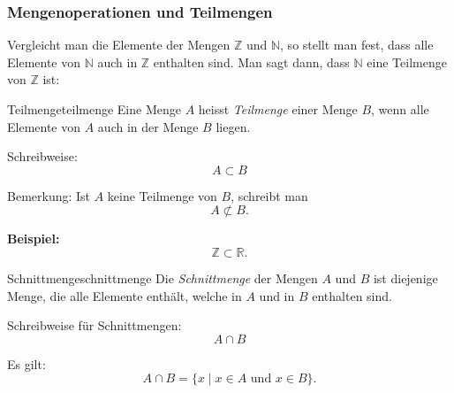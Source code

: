 
\subsubsection{Mengenoperationen und Teilmengen}
Vergleicht man die Elemente der Mengen \(\mathbb{Z}\) und \(\mathbb{N}\), so stellt man fest, dass alle Elemente von \(\mathbb{N}\) auch in \(\mathbb{Z}\) enthalten sind. Man sagt dann, dass \(\mathbb{N}\) eine Teilmenge von \(\mathbb{Z}\) ist:

\begin{definition}{Teilmenge}{teilmenge}
    Eine Menge \(A\) heisst \textit{Teilmenge} einer Menge \(B\), wenn alle Elemente von \(A\) auch in der Menge \(B\) liegen.

    Schreibweise:
    \[
        A \subset B
    \]

    \begin{center}
    \end{center}
\end{definition}

Bemerkung: Ist \(A\) keine Teilmenge von \(B\), schreibt man
\[
    A \not\subset B.
\]

\textbf{Beispiel:}
\[
    \mathbb{Z} \subset \mathbb{R}.
\]

\begin{definition}{Schnittmenge}{schnittmenge}
    Die \textit{Schnittmenge} der Mengen \(A\) und \(B\) ist diejenige Menge, die alle Elemente enthält, welche in \(A\) und in \(B\) enthalten sind.

    Schreibweise für Schnittmengen:
    \[
        A \cap B
    \]

    Es gilt:
    \[
        A \cap B = \{x \mid x \in A \text{ und } x \in B\}.
    \]

    \begin{center}
    \end{center}
\end{definition}

